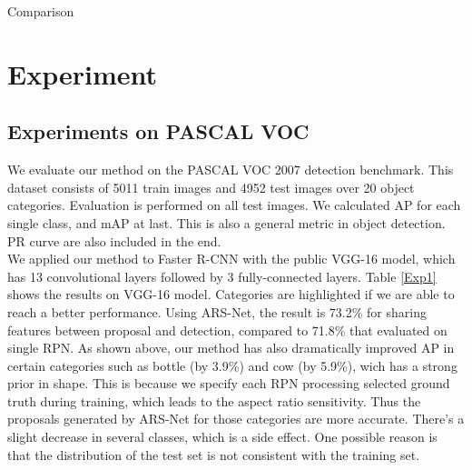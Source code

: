 \documentclass[10pt,twocolumn,letterpaper]{article}
\begin{document}
\begin{table}[ht]
\label{Exp1}
\centering
\caption{Comparison}
\end{table}

\section{Experiment}
\subsection{Experiments on PASCAL VOC}
We evaluate our method on the PASCAL VOC 2007 detection benchmark. This dataset consists of 5011 train images and 4952 test images over 20 object categories. Evaluation is performed on all test images. We calculated AP for each single class, and mAP at last. This is also a general metric in object detection. PR curve are also included in the end. \\
\indent{}We applied our method to Faster R-CNN with the public VGG-16 model, which has 13 convolutional layers followed by 3 fully-connected layers. Table \ref{Exp1} shows the results on VGG-16 model. Categories are highlighted if we are able to reach a better performance. Using ARS-Net, the result is 73.2\% for sharing features between proposal and detection, compared to 71.8\% that evaluated on single RPN. As shown above, our method has also dramatically improved AP in certain categories such as bottle (by 3.9\%) and cow (by 5.9\%), wich has a strong prior in shape. This is because we specify each RPN processing selected ground truth during training, which leads to the aspect ratio sensitivity. Thus the proposals generated by ARS-Net for those categories are more accurate. There's a slight decrease in several classes, which is a side effect. One possible reason is that the distribution of the test set is not consistent with the training set.
\end{document}
